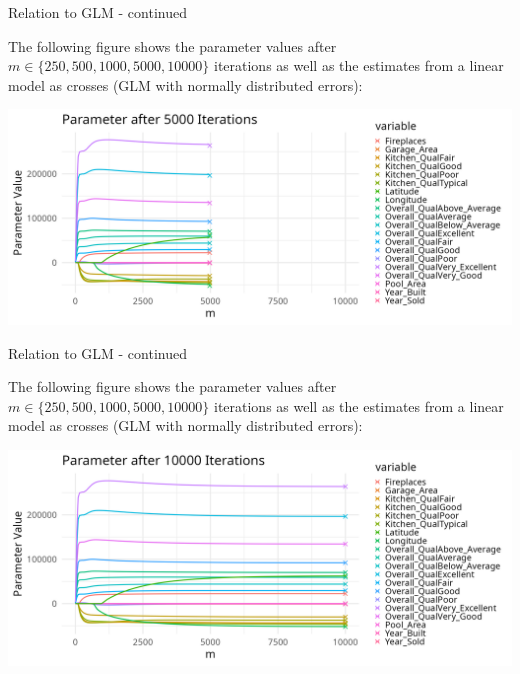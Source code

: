 \documentclass[11pt,compress,t,notes=noshow, xcolor=table]{beamer}
\begin{document}
\begin{vbframe}{Relation to GLM - continued}

The following figure shows the parameter values after $m \in \{250, 500, 1000, 5000, 10000\}$ iterations as well as the estimates from a linear model as crosses (GLM with normally distributed errors):

\begin{center}
\includegraphics[width=\textwidth]{figure/compboost-to-glm-iter5000.png}
\end{center}

\end{vbframe}

\begin{vbframe}{Relation to GLM - continued}

The following figure shows the parameter values after $m \in \{250, 500, 1000, 5000, 10000\}$ iterations as well as the estimates from a linear model as crosses (GLM with normally distributed errors):

\begin{center}
\includegraphics[width=\textwidth]{figure/compboost-to-glm-iter10000.png}
\end{center}
\end{vbframe}


\endlecture
\end{document}
